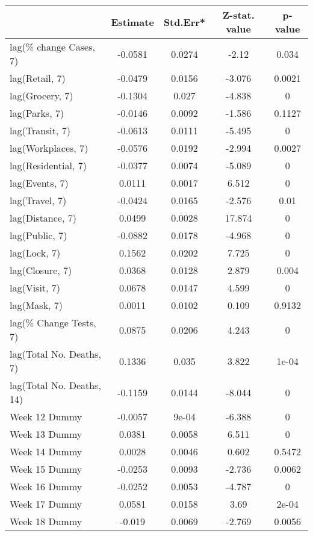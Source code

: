 \begingroup\tiny
\begin{longtable}{lcccc}
  \toprule
 & Estimate & Std.Err* & Z-stat. value & p-value \\ 
  \midrule
lag(\% change Cases, 7) & -0.0581 & 0.0274 & -2.12 & 0.034 \\ 
  lag(Retail, 7) & -0.0479 & 0.0156 & -3.076 & 0.0021 \\ 
  lag(Grocery, 7) & -0.1304 & 0.027 & -4.838 & 0 \\ 
  lag(Parks, 7) & -0.0146 & 0.0092 & -1.586 & 0.1127 \\ 
  lag(Transit, 7) & -0.0613 & 0.0111 & -5.495 & 0 \\ 
  lag(Workplaces, 7) & -0.0576 & 0.0192 & -2.994 & 0.0027 \\ 
  lag(Residential, 7) & -0.0377 & 0.0074 & -5.089 & 0 \\ 
  lag(Events, 7) & 0.0111 & 0.0017 & 6.512 & 0 \\ 
  lag(Travel, 7) & -0.0424 & 0.0165 & -2.576 & 0.01 \\ 
  lag(Distance, 7) & 0.0499 & 0.0028 & 17.874 & 0 \\ 
  lag(Public, 7) & -0.0882 & 0.0178 & -4.968 & 0 \\ 
  lag(Lock, 7) & 0.1562 & 0.0202 & 7.725 & 0 \\ 
  lag(Closure, 7) & 0.0368 & 0.0128 & 2.879 & 0.004 \\ 
  lag(Visit, 7) & 0.0678 & 0.0147 & 4.599 & 0 \\ 
  lag(Mask, 7) & 0.0011 & 0.0102 & 0.109 & 0.9132 \\ 
  lag(\% Change Tests, 7) & 0.0875 & 0.0206 & 4.243 & 0 \\ 
  lag(Total No. Deaths, 7) & 0.1336 & 0.035 & 3.822 & 1e-04 \\ 
  lag(Total No. Deaths, 14) & -0.1159 & 0.0144 & -8.044 & 0 \\ 
  Week 12 Dummy & -0.0057 & 9e-04 & -6.388 & 0 \\ 
  Week 13 Dummy & 0.0381 & 0.0058 & 6.511 & 0 \\ 
  Week 14 Dummy & 0.0028 & 0.0046 & 0.602 & 0.5472 \\ 
  Week 15 Dummy & -0.0253 & 0.0093 & -2.736 & 0.0062 \\ 
  Week 16 Dummy & -0.0252 & 0.0053 & -4.787 & 0 \\ 
  Week 17 Dummy & 0.0581 & 0.0158 & 3.69 & 2e-04 \\ 
  Week 18 Dummy & -0.019 & 0.0069 & -2.769 & 0.0056 \\ 

\end{longtable}

